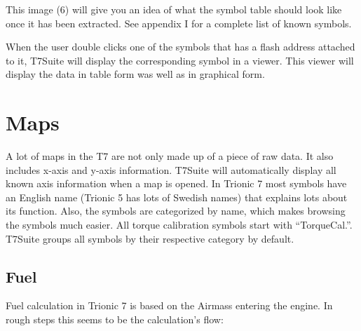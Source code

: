 \documentclass[11pt,a4paper]{book}
\begin{document}
This image (6) will give you an idea of what the symbol table should look like once it has been
extracted. See appendix I for a complete list of known symbols.
\begin{figure}[<+htpb+>]
    \centering
    \missingfigure{}
    \caption{}
    \label{fig:}
\end{figure}

When the user double clicks one of the symbols that has a flash address attached to it, T7Suite will
display the corresponding symbol in a viewer. This viewer will display the data in table form was well
as in graphical form.
\begin{figure}[<+htpb+>]
    \centering
    \missingfigure{}
    \caption{}
    \label{fig:}
\end{figure}


\chapter{Maps}
A lot of maps in the T7 are not only made up of a piece of raw data. It also
includes x-axis and y-axis information. T7Suite will automatically display all
known axis information when a map is opened. In Trionic 7 most symbols have an
English name (Trionic 5 has lots of Swedish names) that explains lots about its
function. Also, the symbols are categorized by name, which makes browsing the
symbols much easier. All torque calibration symbols start with “TorqueCal.”.
T7Suite groups all symbols by their respective category by default.

\section{Fuel}
Fuel calculation in Trionic 7 is based on the Airmass entering the engine. In rough steps this seems to
be the calculation’s flow:
\end{document}
